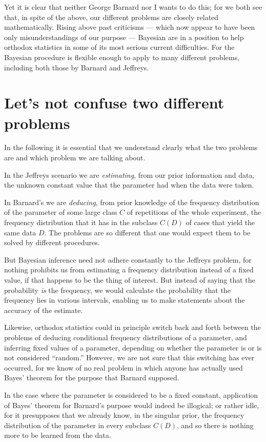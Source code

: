 \documentclass[12pt]{article}
\begin{document}
Yet it is clear that neither George Barnard nor I wants to
do this; for we both see that, in spite of the above, our
different problems are closely related mathematically. Rising above past criticisms --- which now appear to have been only misunderstandings of our purpose --- Bayesian are in a position to help orthodox statistics in some of its most serious current difficulties. For the Bayesian procedure is flexible enough to apply to many different problems, including both those by Barnard and Jeffreys.

\section{Let's not confuse two different problems}

In the following it is essential that we understand clearly what the two problems are and which problem we are talking about.

In the Jeffreys scenario we are \emph{estimating}, from our prior information and data, the unknown constant value that the parameter had when the data were taken.

In Barnard's we are \emph{deducing}, from prior knowledge of the frequency distribution of the parameter of some large class $C$ of repetitions of the whole experiment, the frequency distribution that it has in the subclass $C(D)$ of cases that yield the same data $D$. The problems are so different that one would expect them to be solved by different procedures.

But Bayesian inference need not adhere constantly to the Jeffreys problem, for nothing prohibits us from estimating a frequency distribution instead of a fixed value, if that happens to be the thing of interest. But instead of saying that the probability \emph{is} the frequency, we would calculate the probability that the frequency lies in various intervals, enabling us to make statements about the accuracy of the estimate.

Likewise, orthodox statistics could in principle switch back and forth between the problems of deducing conditional frequency distributions of a parameter, and inferring fixed values of a parameter, depending on whether the parameter is or is not considered ``random.'' However, we are not sure that this switching has ever occurred, for we know of no real problem in which anyone has actually used Bayes' theorem for the purpose that Barnard supposed.

In the case where the parameter is considered to be a fixed constant, application of Bayes' theorem for Barnard's purpose would indeed be illogical; or rather idle, for it presupposes that we already know, in the singular prior, the frequency distribution of the parameter in every subclass $C(D)$, and so there is nothing more to be learned from the data.
\end{document}
